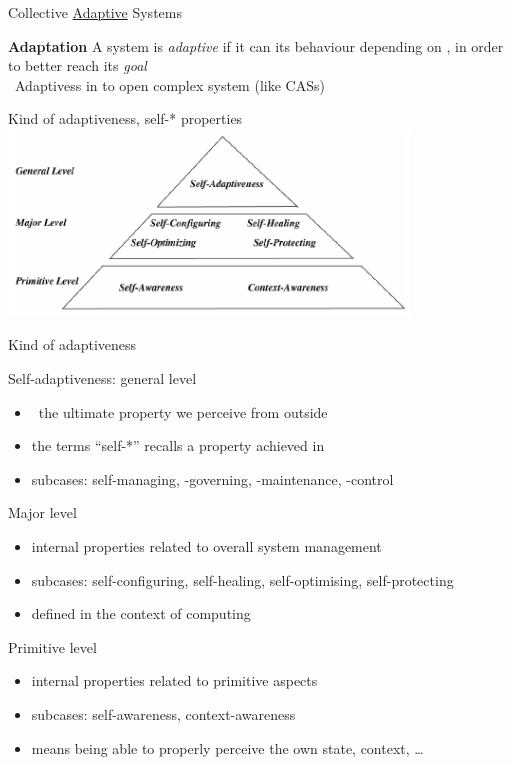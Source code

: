 \documentclass[presentation, 9pt]{beamer}\mode<presentation>{\usetheme{AMSBolognaFC}}
\begin{document}
\begin{frame}{Collective \underline{Adaptive} Systems}
\begin{alertblock}{\textbf{Adaptation}}
A system is \emph{adaptive} if it can  its behaviour
depending on , in order to better reach its \emph{goal}\\
\faArrowRight \, Adaptivess in  to open complex system (like CASs)
\end{alertblock}
\begin{exampleblock}{Kind of adaptiveness, self-* properties}
	\centering
	\includegraphics[width=0.8\textwidth]{img/self-*.png}
\end{exampleblock}
\end{frame}
\begin{frame}{Kind of adaptiveness}
\begin{exampleblock}{Self-adaptiveness: general level}
	\begin{itemize}
		\item {} \faArrowRight \, the ultimate property we perceive from outside
		\item the terms ``self-*'' recalls a property achieved in 
		\item subcases: self-managing, -governing, -maintenance, -control
	\end{itemize}
\end{exampleblock}
\begin{exampleblock}{Major level}
	\begin{itemize}
		\item internal properties related to overall system management
		\item subcases: self-configuring, self-healing, self-optimising, self-protecting
		\item defined in the context of  computing
	\end{itemize}
\end{exampleblock}
\begin{exampleblock}{Primitive level}
	\begin{itemize}
		\item internal properties related to primitive aspects
		\item subcases: self-awareness, context-awareness
		\item means being able to properly perceive the own state, context, \dots
	\end{itemize}
\end{exampleblock}
\end{frame}
\end{document}
